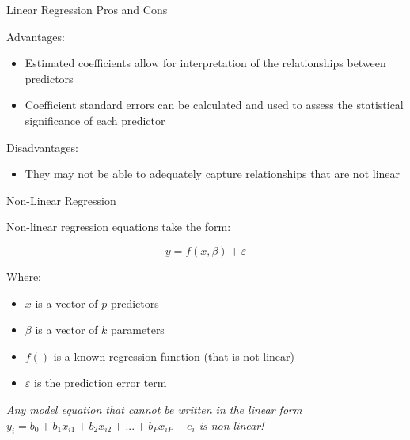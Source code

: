 \documentclass[ignorenonframetext,]{beamer}
\providecommand{\tightlist}{%
  \setlength{\itemsep}{0pt}\setlength{\parskip}{0pt}}
\begin{document}
\begin{frame}{Linear Regression Pros and Cons}

\begin{block}{Advantages:}

\begin{itemize}
\tightlist
\item
  Estimated coefficients allow for interpretation of the relationships
  between predictors
\item
  Coefficient standard errors can be calculated and used to assess the
  statistical significance of each predictor
\end{itemize}

\end{block}

\begin{block}{Disadvantages:}

\begin{itemize}
\tightlist
\item
  They may not be able to adequately capture relationships that are not
  linear
\end{itemize}

\end{block}

\end{frame}

\begin{frame}{Non-Linear Regression}

\begin{block}{Non-linear regression equations take the form:}

\begin{block}{\[y = f(x,\beta) + \varepsilon\]}

Where:

\begin{itemize}
\tightlist
\item
  \(x\) is a vector of \(p\) predictors
\item
  \(\beta\) is a vector of \(k\) parameters
\item
  \(f()\) is a known regression function (that is not linear)
\item
  \(\varepsilon\) is the prediction error term
\end{itemize}

\begin{block}{\emph{Any model equation that cannot be written in the
linear form
\(y_i = b_0 + b_1x_{i1} + b_2x_{i2} + ... + b_Px_{iP} + e_i\) is
non-linear!}}

\end{block}

\end{block}

\end{block}

\end{frame}
\end{document}

